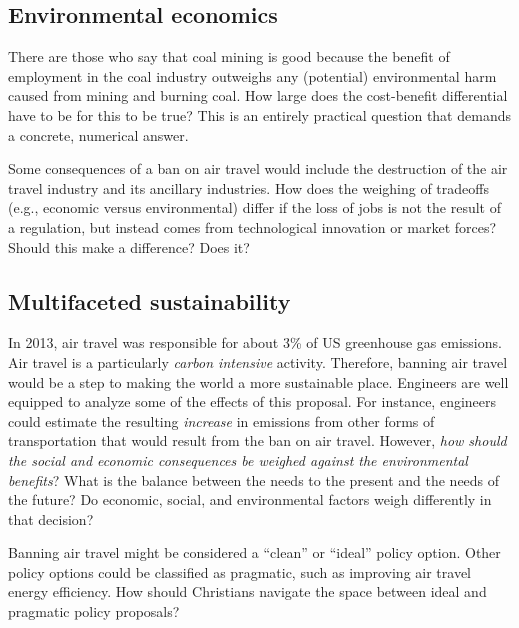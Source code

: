 \documentclass[12pt]{article}
\begin{document}
\subsection{Environmental economics}
There are those who say that coal mining is good because the benefit of employment in the coal industry outweighs
any (potential) environmental harm caused from mining and burning coal. How large does the cost-benefit differential
have to be for this to be true? This is an entirely practical question that demands a concrete, numerical answer.

Some consequences of a ban on air travel would include the destruction of the air travel industry and its ancillary
industries. How does the weighing of tradeoffs (e.g., economic versus environmental) differ if the loss of jobs is not
the result of a regulation, but instead comes from technological innovation or market forces? Should this make a
difference? Does it?

\subsection{Multifaceted sustainability}
In 2013, air travel was responsible for about 3\% of US greenhouse gas emissions. %
Air travel is a particularly \emph{carbon intensive} activity. Therefore, banning air travel would be a step to making the 
world a more sustainable place. Engineers are well equipped to analyze some of the effects of this proposal. For instance,
engineers could estimate the resulting \emph{increase} in emissions from other forms of transportation that would result from 
the ban on air travel. However, \emph{how should the social and economic consequences be weighed against the environmental 
benefits}? What is the balance between the needs to the present and the needs of the future?	
Do economic, social, and environmental factors weigh differently in that decision?	

Banning air travel might be considered a ``clean'' or ``ideal'' policy option. Other policy options could be classified
as pragmatic, such as improving air travel energy efficiency. How should Christians navigate the space between ideal and
pragmatic policy proposals?
\end{document}

